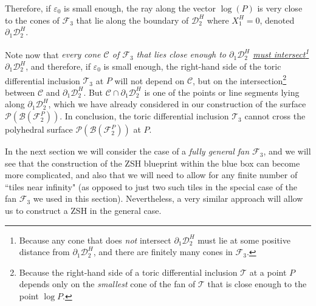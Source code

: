 \documentclass[12pt,letterpaper]{article}
\newcommand{\C}{\mathcal{C}}
\newcommand{\T}{\mathcal{T}}
\renewcommand{\P}{\mathcal{P}}
\newcommand{\B}{\mathcal{B}}
\newcommand{\D}{\mathcal{D}}
\newcommand{\F}{\mathcal{F}}
\newcommand{\eps}{\varepsilon}
\begin{document}
Therefore, if $\eps_0$ is small enough, the ray along the vector $\log(P)$ is very close to the cones of $\F_3$ that lie along the boundary of $\D_2^H$ where $X_1^H = 0$, denoted $\partial_1\D_2^H$. 

Note now that {\em every cone $\C$ of $\F_3$ that lies close enough to $\partial_1\D_2^H$ \underline{must intersect}\footnote{Because  any cone that does {\em not} intersect $\partial_1\D_2^H$ must lie at some positive distance from $\partial_1\D_2^H$, and there are finitely many cones in $\F_3$.} $\partial_1\D_2^H$}, and therefore, if $\eps_0$ is small enough, the right-hand side of the toric differential inclusion  $\T_3$ at $P$ will not depend on $\C$, but on the intersection\footnote{Because the right-hand side of a toric differential inclusion $\T$ at a point $P$ depends only on the {\em smallest} cone of the fan of $\T$ that is close enough to the point $\log P$.} between $\C$ and $\partial_1\D_2^H$. But $\C \cap \partial_1\D_2^H$ is one of the points or line segments lying along $\partial_1\D_2^H$, which we have already considered in our construction of the surface $\P(\B(\mathcal{F}_2^P))$. In conclusion,   the toric differential inclusion $\T_3$ cannot cross the polyhedral surface $\P(\B(\mathcal{F}_2^P))$  at $P$. 






\bigskip


 





In the next section 
we will consider the case of a {\em fully general fan $\F_3$}, and we will see that the construction of the ZSH blueprint within the blue box can become more complicated, and also that we will need to allow for any finite number of ``tiles near infinity" (as opposed to just two such tiles in the special case of the fan $\F_3$ we used in this section). Nevertheless, a very similar approach will allow us to construct a ZSH in the general case.

%
\end{document}
